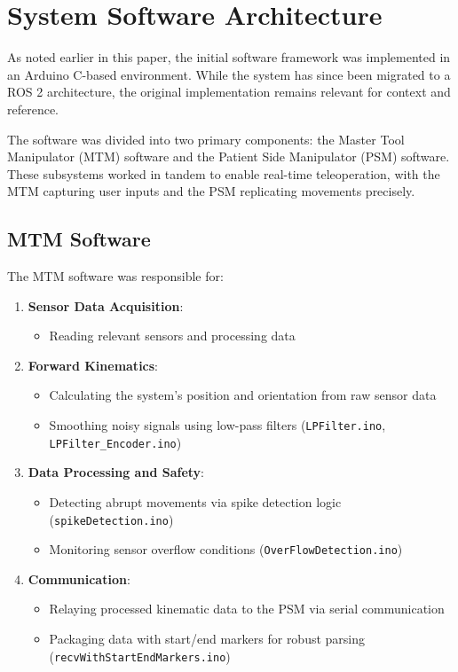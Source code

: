 \section{System Software Architecture}
\label{sec:software_architecture}

As noted earlier in this paper, the initial software framework was implemented in an Arduino C-based environment. While the system has since been migrated to a ROS 2 architecture, the original implementation remains relevant for context and reference.

The software was divided into two primary components: the Master Tool Manipulator (MTM) software and the Patient Side Manipulator (PSM) software. These subsystems worked in tandem to enable real-time teleoperation, with the MTM capturing user inputs and the PSM replicating movements precisely.

\subsection{MTM Software}
The MTM software was responsible for:

\begin{enumerate}
    \item \textbf{Sensor Data Acquisition}:
    \begin{itemize}
        \item Reading relevant sensors and processing data
    \end{itemize}
    
    \item \textbf{Forward Kinematics}:
    \begin{itemize}
        \item Calculating the system's position and orientation from raw sensor data
        \item Smoothing noisy signals using low-pass filters (\texttt{LPFilter.ino}, \texttt{LPFilter\_Encoder.ino})
    \end{itemize}
    
    \item \textbf{Data Processing and Safety}:
    \begin{itemize}
        \item Detecting abrupt movements via spike detection logic (\texttt{spikeDetection.ino})
        \item Monitoring sensor overflow conditions (\texttt{OverFlowDetection.ino})
    \end{itemize}
    
    \item \textbf{Communication}:
    \begin{itemize}
        \item Relaying processed kinematic data to the PSM via serial communication
        \item Packaging data with start/end markers for robust parsing (\texttt{recvWithStartEndMarkers.ino})
    \end{itemize}
\end{enumerate}

